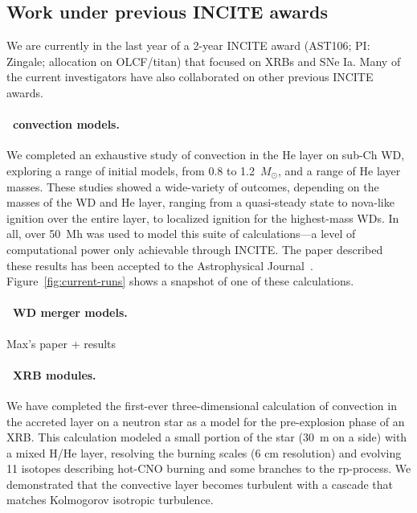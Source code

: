\documentclass[11pt,letterpaper,english]{article}
\begin{document}
\subsection{Work under previous INCITE awards}

We are currently in the last year of a 2-year INCITE award (AST106;
PI: Zingale; allocation on OLCF/titan) that focused on XRBs and SNe
Ia.  Many of the current investigators have also collaborated on other
previous INCITE awards.  

\paragraph{\maestro\ convection models.}
%
We completed an exhaustive study of convection in the He layer on  
sub-Ch WD, exploring a range of initial models, from 0.8 to
1.2~$M_\odot$, and a range of He layer masses.  These studies showed
a wide-variety of outcomes, depending on the masses of the WD and He
layer, ranging from a quasi-steady state to nova-like ignition over
the entire layer, to localized ignition for the highest-mass WDs.  In
all, over 50~Mh was used to model this suite of calculations---a level of
computational power only achievable through INCITE.  The paper described
these results has been accepted to the Astrophysical Journal~\cite{jacobs:2016}.
Figure~\ref{fig:current-runs} shows a snapshot of one of these calculations.

\paragraph{\castro\ WD merger models.}
%
Max's paper + results



\paragraph{\maestro\ XRB modules.}
%
We have completed the first-ever three-dimensional calculation of
convection in the accreted layer on a neutron star as a model for the
pre-explosion phase of an XRB.  This calculation modeled a small
portion of the star (30~m on a side) with a mixed H/He layer,
resolving the burning scales (6 cm resolution) and evolving 11
isotopes describing hot-CNO burning and some branches to the
rp-process.  We demonstrated that the convective layer becomes
turbulent with a cascade that matches Kolmogorov isotropic turbulence.
\end{document}
